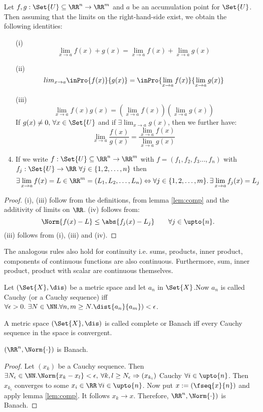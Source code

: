\begin{thm}
 Let $f,g:\Set{U}\subseteq\RR^n\to\RR^m$ and $a$ be an accumulation point for $\Set{U}$. Then assuming that the limits on the right-hand-side exist, we obtain the following identities:
 \begin{enumerate}
  \item[(i)] $$\lim_{x\to a}f(x)+g(x)=\lim_{x\to a}f(x)+\lim_{x\to a}g(x)$$
  \item[(ii)] $$lim_{x\to a}\inPro{f(x)}{g(x)}=\inPro{\lim_{x\to a}f(x)}{\lim_{x\to a}g(x)}$$
  \item[(iii)] $$\lim_{x\to a}f(x)g(x)=\left(\lim_{x\to a}f(x)\right)\left(\lim_{x\to a}g(x)\right)$$
  If $g(x)\neq 0,\,\forall x\in\Set{U}$ and if $\exists \lim_{x\to a}g(x)$, then we further have:
  $$\lim_{x\to a}\frac{f(x)}{g(x)}=\frac{\lim_{x\to a}f(x)}{\lim_{x\to a}g(x)}$$
  \item If we write $f:\Set{U}\subseteq\RR^n\to\RR^m$ with $f=(f_1,f_2,f_3\ldots,f_n)$ with $f_j:\Set{U}\to\RR\ \forall j\in\{1,2,\ldots,n\}$ then $$\exists\lim_{x\to a}f(x)=L\in \RR^m=(L_1,L_2,\ldots,L_n)\Leftrightarrow \forall j\in\{1,2,\ldots,m\}.\,\exists\lim_{x\to a}f_j(x)=L_j$$
 \end{enumerate}
\end{thm}
\begin{proof}
 (i), (iii) follow from the definitions, from lemma \ref{lem:comp} and the additivity of limits on $\RR$.
 (iv) follows from: $$\Norm{f(x)-L}\leq \abs{f_j(x)-L_j}\qquad\forall j\in\upto{n}.$$
 (iii) follows from (i), (iii) and (iv).
\end{proof}
\begin{rem}
 The analogous rules also hold for continuity i.e. sums, products, inner product, components of continuous functions are also continuous. Furthermore, sum, inner product, product with scalar are continuous themselves.
\end{rem}
\begin{defn}
	Let $(\Set{X},\dis)$ be a metric space and let $a_n$ in $\Set{X}$.Now $a_n$ is called Cauchy (or a Cauchy sequence) iff $\forall \epsilon>0.\ \exists N\in\NN.\forall n,m\geq N.\dist{a_n}{a_m})<\epsilon$.
\end{defn}
\begin{defn}
	\label{defn:Banach}
	A metric space $(\Set{X},\dis)$ is called complete or Banach iff every Cauchy sequence in the space is convergent.
\end{defn}
\begin{thm}
 $(\RR^n,\Norm{\cdot})$ is Banach.
\end{thm}
\begin{proof}
 Let $(x_k)$ be a Cauchy sequence. Then $\exists N_\epsilon\in\NN.\Norm{x_k-x_l}<\epsilon, \:\forall k,l \geq N_\epsilon\Rightarrow (x_{k_i})$ Cauchy $\forall i\in\upto{n}$. Then $x_{k_i}$ converges to some $x_i\in\RR\:\forall i\in\upto{n}$. Now put $x:=(\fseq{x}{n})$ and apply lemma \ref{lem:comp}. It follows $x_k\to x$. Therefore, $\RR^n, \Norm{\cdot})$ is Banach.
\end{proof}
